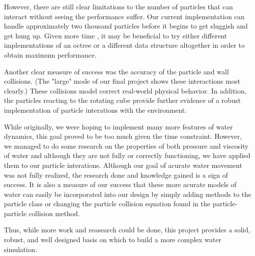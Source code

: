 However, there are still clear limitations to the number of particles that can interact
without seeing the performance suffer.  Our current implementation can handle approximately 
two thousand particles before it begins to get sluggish and get hung up.  Given more time
, it may be beneficial to try either different implementations of an octree or a different
data structure altogether in order to obtain maximum performance.

Another clear measure of success was the accuracy of the particle and wall collisions. 
(The "large" mode of our final project shows these interactions most clearly.) These
collisions model correct real-world physical behavior.  In addition, the particles reacting
to the rotating cube provide further evidence of a robust implementation of particle
interations with the environment.

While originally, we were hoping to implement many more features of water dynamics, this
goal proved to be too much given the time constraint.  However, we managed to do some 
research on the properties of both pressure and viscosity of water and although they are 
not fully or correctly functioning, we have applied them to our particle interations. 
Although our goal of acurate water movement was not fully realized, the research done 
and knowledge gained is a sign of success.  It is also a measure of our success that these 
more acurate models of water can easily be incorporated into our design by simply adding
methods to the particle class or changing the particle collision equation found in the
particle-particle collision method.  

Thus, while more work and reasearch could be done, this project provides a solid, robust,
and well designed basis on which to build a more complex water simulation.  





